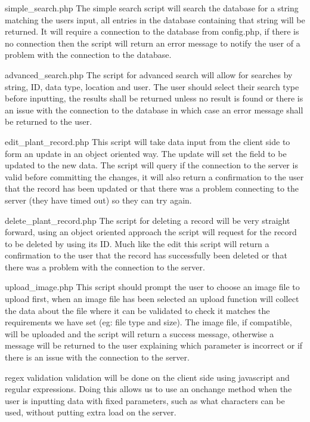 simple_search.php
The simple search script will search the database for a string matching the users input, all entries in the database containing that string will be returned. It will require a connection to the database from config.php, if there is no connection then the script will return an error message to notify the user of a problem with the connection to the database.

advanced_search.php
The script for advanced search will allow for searches by string, ID, data type, location and user. The user should select their search type before inputting, the results shall be returned unless no result is found or there is an issue with the connection to the database in which case an error message shall be returned to the user. 

edit_plant_record.php
This script will take data input from the client side to form an update in an object oriented way. The update will set the field to be updated to the new data. The script will query if the connection to the server is valid before committing the changes, it will also return a confirmation to the user that the record has been updated or that there was a problem connecting to the server (they have timed out) so they can try again.

delete_plant_record.php
The script for deleting a record will be very straight forward, using an object oriented approach the script will request for the record to be deleted by using its ID. Much like the edit this script will return a confirmation to the user that the record has successfully been deleted or that there was a problem with the connection to the server.

upload_image.php
This script should prompt the user to choose an image file to upload first, when an image file has been selected an upload function will collect the data about the file where it can be validated to check it matches the requirements we have set (eg: file type and size). The image file, if compatible, will be uploaded and the script will return a success message, otherwise a message will be returned to the user explaining which parameter is incorrect or if there is an issue with the connection to the server.

regex validation
validation will be done on the client side using javascript and regular expressions. Doing this allows us to use an onchange method when the user is inputting data with fixed parameters, such as what characters can be used, without putting extra load on the server.
